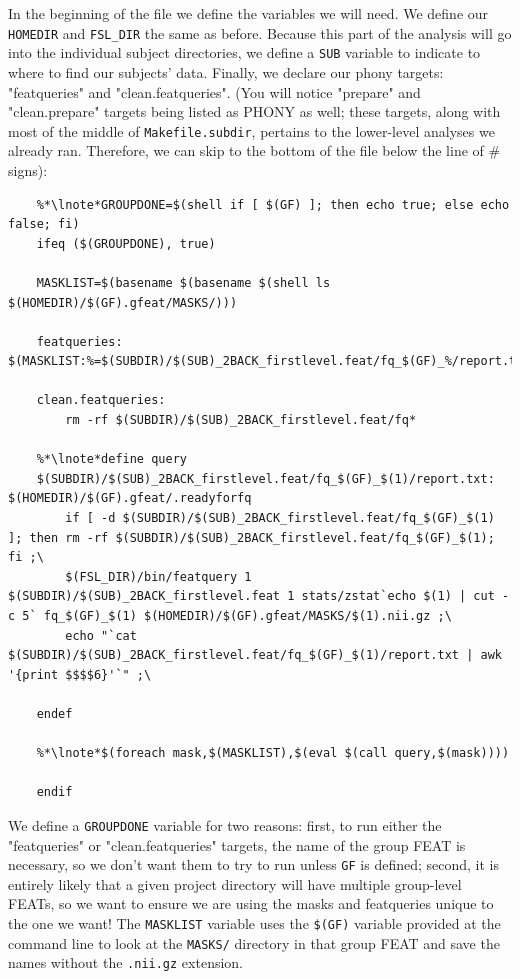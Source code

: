 In the beginning of the file we define the variables we will need. We define our \texttt{HOMEDIR} and \texttt{FSL_DIR} the same as before. Because this part of the analysis will go into the individual subject directories, we define a \texttt{SUB} variable to indicate to \maken{} where to find our subjects' data. Finally, we declare our phony targets: "featqueries" and "clean.featqueries". (You will notice "prepare" and "clean.prepare" targets being listed as PHONY as well; these targets, along with most of the middle of \texttt{Makefile.subdir}, pertains to the lower-level analyses we already ran. Therefore, we can skip to the bottom of the file below the line of \# signs):
\begin{lstlisting}	
	%*\lnote*GROUPDONE=$(shell if [ $(GF) ]; then echo true; else echo false; fi)
	ifeq ($(GROUPDONE), true)
	
	MASKLIST=$(basename $(basename $(shell ls $(HOMEDIR)/$(GF).gfeat/MASKS/)))
	
	featqueries: $(MASKLIST:%=$(SUBDIR)/$(SUB)_2BACK_firstlevel.feat/fq_$(GF)_%/report.txt)
	
	clean.featqueries:
		rm -rf $(SUBDIR)/$(SUB)_2BACK_firstlevel.feat/fq*
	
	%*\lnote*define query
	$(SUBDIR)/$(SUB)_2BACK_firstlevel.feat/fq_$(GF)_$(1)/report.txt: $(HOMEDIR)/$(GF).gfeat/.readyforfq
		if [ -d $(SUBDIR)/$(SUB)_2BACK_firstlevel.feat/fq_$(GF)_$(1) ]; then rm -rf $(SUBDIR)/$(SUB)_2BACK_firstlevel.feat/fq_$(GF)_$(1); fi ;\
		$(FSL_DIR)/bin/featquery 1 $(SUBDIR)/$(SUB)_2BACK_firstlevel.feat 1 stats/zstat`echo $(1) | cut -c 5` fq_$(GF)_$(1) $(HOMEDIR)/$(GF).gfeat/MASKS/$(1).nii.gz ;\
		echo "`cat $(SUBDIR)/$(SUB)_2BACK_firstlevel.feat/fq_$(GF)_$(1)/report.txt | awk '{print $$$$6}'`" ;\
		
	endef
	
	%*\lnote*$(foreach mask,$(MASKLIST),$(eval $(call query,$(mask))))
	
	endif
\end{lstlisting}

We define a \texttt{GROUPDONE} variable for two reasons: first, to run either the "featqueries" or "clean.featqueries" targets, the name of the group FEAT is necessary, so we don't want them to try to run unless \texttt{GF} is defined; second, it is entirely likely that a given project directory will have multiple group-level FEATs, so we want to ensure we are using the masks and featqueries unique to the one we want! The \texttt{MASKLIST} variable uses the \texttt{\$(GF)} variable provided at the command line to look at the \texttt{MASKS/} directory in that group FEAT and save the names without the \texttt{.nii.gz} extension. 


